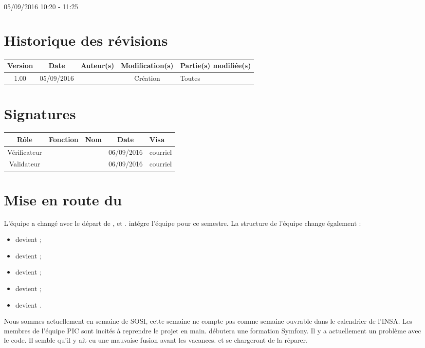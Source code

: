 \documentclass [a4paper] {article}
\begin{document}
05/09/2016			 				%
\hfill   
\hfill 	 10:20 - 11:25				%



\section*{Historique des révisions}
\begin{center}
			\begin{tabular}{| c | c | c | c | p{4cm} |}
				\hline
				\rowcolor{Gray}
				Version & Date & Auteur(s) & Modification(s) & Partie(s) modifiée(s)		 \\
				\hline
				1.00 & 05/09/2016 & \Kafui & Création & Toutes \\
		\hline		
			\end{tabular}
		\end{center}

\section*{Signatures}

		\begin{center}
			\begin{tabular}{| c | c | c | c | p{4cm} |}
				\hline
				\rowcolor{Gray}
				Rôle & Fonction & Nom & Date & Visa		 \\
				\hline
				Vérificateur & \RQ & \Melissa & 06/09/2016 & courriel \\[30pt]
				\hline
				Validateur & \CP & \Pierre & 06/09/2016 & courriel \\[30pt]	
				\hline
			\end{tabular}
		\end{center}

\section{Mise en route du \PIC}
L'équipe a changé avec le départ de \Mathieu{}, \Michel{} et \Sergi. \Francois{} intégre l'équipe pour ce semestre.
La structure de l'équipe change également :
\begin{itemize}
\item \Pierre{} devient \CP;
\item \Francois{} devient \CPA;
\item \Kafui{} devient \RQ;
\item \Julie{} devient \RD;
\item \Melissa{} devient \RGC.
\end{itemize}
Nous sommes actuellement en semaine de SOSI, cette semaine ne compte pas comme semaine ouvrable dans le calendrier de l'INSA. Les membres de l'équipe PIC sont incités à reprendre le projet en main. \Francois{} débutera une formation Symfony.
Il y a actuellement un problème avec le code. Il semble qu'il y ait eu une mauvaise fusion avant les vacances. \Julie{} et \Florian{} se chargeront de la réparer.
\end{document}
